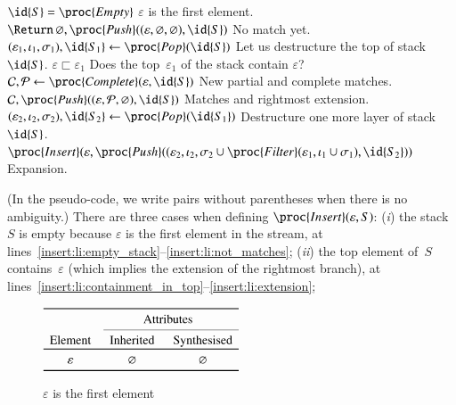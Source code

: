 \begin{codebox}
\li \If \(\id{S} = \proc{Empty}\) \label{insert:li:empty_stack}
\RComment \(\varepsilon\) is the first element.
\li \Then \(\Return \, \varnothing, \proc{Push} ((\varepsilon, \varnothing,
                        \varnothing), \id{S})\)
          \label{insert:li:not_matches}
\RComment No match yet.
\End
\li \((\varepsilon_1, \iota_1, \sigma_1), \id{S_1}
      \gets \proc{Pop}(\id{S})\)
    \label{insert:li:first_pop}
\RComment Let us destructure the top of stack \(\id{S}\).
\li \If \(\varepsilon \sqsubset \varepsilon_1\)
    \label{insert:li:containment_in_top}
\RComment Does the top~\(\varepsilon_1\) of the stack contain \(\varepsilon\)?
\li \Then \({\cal C}, {\cal P} \gets \proc{Complete} (\varepsilon, \id{S})\)
    \label{insert:li:complete_stack}
\RComment New partial and complete matches.
\li \Return \({\cal C}, \proc{Push} ((\varepsilon, {\cal P},
                                          \varnothing),
                                         \id{S})\)
    \label{insert:li:extension}
\RComment Matches and rightmost extension.
    \End
\li  \((\varepsilon_2, \iota_2, \sigma_2), \id{S_2}
       \gets \proc{Pop} (\id{S_1})\)
     \label{insert:li:second_pop}
\RComment Destructure one more layer of stack \(\id{S}\).
\li \Return \(\proc{Insert}
  (\varepsilon,
   \proc{Push} ((\varepsilon_2,
                 \iota_2,
                 \sigma_2 \cup \proc{Filter}(\varepsilon_1,
                                             \iota_1 \cup \sigma_1),
                \id{S_2}))\)
     \label{insert:li:expansion}
\RComment Expansion.
\end{codebox}
\noindent (In the pseudo\hyp{}code, we write pairs without parentheses
when there is no ambiguity.) There are three cases when defining
\(\proc{Insert} (\varepsilon, S)\): (\emph{i}) the stack~\(S\)
is empty because \(\varepsilon\) is the first element in the stream,
at lines~\ref{insert:li:empty_stack}--\ref{insert:li:not_matches};
(\emph{ii}) the top element of~\(S\) contains~\(\varepsilon\) (which
implies the extension of the rightmost branch), at
lines~\ref{insert:li:containment_in_top}--\ref{insert:li:extension};
\begin{figure}[b]
\centering
\(
\begin{array}{c>{\hspace*{5pt}}c>{\hspace*{5pt}}c}
\toprule
& \multicolumn{2}{c}{\text{Attributes}}\\
\cmidrule(l){2-3}
\text{Element} & \text{Inherited} & \text{Synthesised}\\
\toprule
\varepsilon & \varnothing & \varnothing\\
\bottomrule
\end{array}
\)
\caption{\(\varepsilon\) is the first element}
\label{fig:first_elem}
\end{figure}
